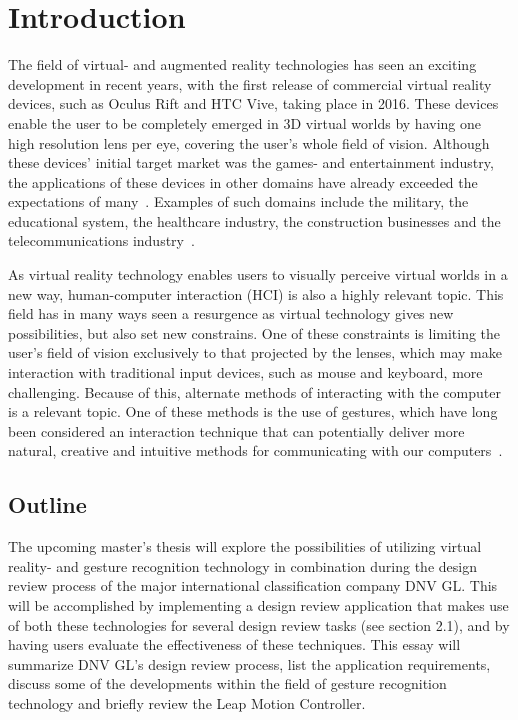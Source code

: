 \chapter{Introduction}                  
The field of virtual- and augmented reality technologies has seen an exciting development in recent years, with the first release of commercial virtual reality devices, such as Oculus Rift and HTC Vive, taking place in 2016. These devices enable the user to be completely emerged in 3D virtual worlds by having one high resolution lens per eye, covering the user's whole field of vision. Although these devices' initial target market was the games- and entertainment industry, the applications of these devices in other domains have already exceeded the expectations of many~\citep{VRS2016}. Examples of such domains include the military, the educational system, the healthcare industry, the construction businesses and the telecommunications industry~\citep{VRS2016}. 

As virtual reality technology enables users to visually perceive virtual worlds in a new way, human-computer interaction (HCI) is also a highly relevant topic. This field has in many ways seen a resurgence as virtual technology gives new possibilities, but also set new constrains. One of these constraints is limiting the user's field of vision exclusively to that projected by the lenses, which may make interaction with traditional input devices, such as mouse and keyboard, more challenging. Because of this, alternate methods of interacting with the computer is a relevant topic. One of these methods is the use of gestures, which have long been considered an interaction technique that can potentially deliver more natural, creative and intuitive methods for communicating with our computers~\citep{Rautaray2015}. 

\section{Outline}
The upcoming master's thesis will explore the possibilities of utilizing virtual reality- and gesture recognition technology in combination during the design review process of the major international classification company DNV GL. This will be accomplished by implementing a design review application that makes use of both these technologies for several design review tasks (see section 2.1), and by having users evaluate the effectiveness of these techniques. This essay will summarize DNV GL's design review process, list the application requirements, discuss some of the developments within the field of gesture recognition technology and briefly review the Leap Motion Controller.
